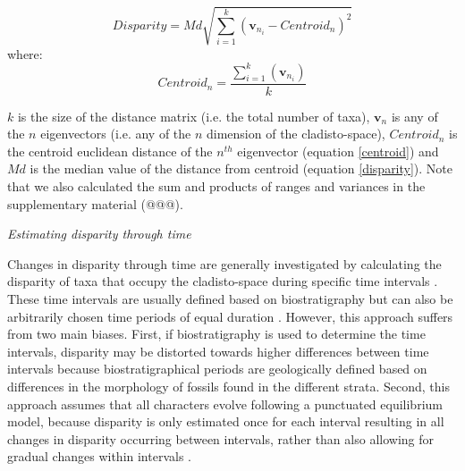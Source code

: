 \documentclass[12pt,letterpaper]{article}
\renewcommand{\subsection}[1]{%
\bigskip
\begin{center}
\begin{large}
\normalfont\itshape #1
\end{large}
\end{center}}
\begin{document}
\begin{equation}
   Disparity=Md{\displaystyle\sqrt{\sum_{i=1}^{k}{(\mathbf{v}_{n_{i}}-Centroid_{n})^2}}}
    \label{disparity}
\end{equation}
where:
\begin{equation}
    Centroid_{n}=\frac{\displaystyle\sum_{i=1}^{k}(\mathbf{v}_{n_{i}})}{k} %
    \label{centroid}
\end{equation}

\noindent
$k$ is the size of the distance matrix (i.e. the total number of taxa), $\mathbf{v}_{n}$ is any of the $n$ eigenvectors (i.e. any of the $n$ dimension of the cladisto-space), %
$Centroid_{n}$ is the centroid euclidean distance of the $n^{th}$ eigenvector (equation \ref{centroid}) and $Md$ is the median value of the distance from centroid (equation \ref{disparity}).
Note that we also calculated the sum and products of ranges and variances in the supplementary material (@@@). %

\subsection{Estimating disparity through time} 
Changes in disparity through time are generally investigated by calculating the disparity of taxa that occupy the cladisto-space during specific time intervals \citep[e.g][]{cisneros2010,prentice2011,Hughes20082013,hopkinsdecoupling2013,bentonmodels2014,bensonfaunal2014}.
These time intervals are usually defined based on biostratigraphy \citep[e.g.][]{cisneros2010,prentice2011,Hughes20082013,bentonmodels2014} but can also be arbitrarily chosen time periods of equal duration \citep{Butler2012,hopkinsdecoupling2013,bensonfaunal2014}.
However, this approach suffers from two main biases. 
First, if biostratigraphy is used to determine the time intervals, disparity may be distorted towards higher differences between time intervals because biostratigraphical periods are geologically defined based on differences in the morphology of fossils found in the different strata.
Second, this approach assumes that all characters evolve following a punctuated equilibrium model, because disparity is only estimated once for each interval resulting in all changes in disparity occurring between intervals, rather than also allowing for gradual changes within intervals \citep{Hunt21042015}.
\end{document}
